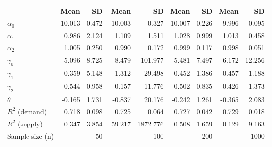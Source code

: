
\begin{tabular}[t]{lrrrrrrrr}
\toprule
  & Mean & SD & Mean  & SD  & Mean   & SD   & Mean    & SD   \\
\midrule
$\alpha_{0}$ & 10.013 & 0.472 & 10.003 & 0.327 & 10.007 & 0.226 & 9.996 & 0.095\\
$\alpha_{1}$ & 0.986 & 2.124 & 1.109 & 1.511 & 1.028 & 0.999 & 1.013 & 0.458\\
$\alpha_{2}$ & 1.005 & 0.250 & 0.990 & 0.172 & 0.999 & 0.117 & 0.998 & 0.051\\
$\gamma_{0}$ & 5.096 & 8.725 & 8.479 & 101.977 & 5.481 & 7.497 & 6.172 & 12.256\\
$\gamma_{1}$ & 0.359 & 5.148 & 1.312 & 29.498 & 0.452 & 1.386 & 0.457 & 1.188\\
$\gamma_{2}$ & 0.544 & 0.958 & 0.157 & 11.776 & 0.502 & 0.835 & 0.426 & 1.373\\
$\theta$ & -0.165 & 1.731 & -0.837 & 20.176 & -0.242 & 1.261 & -0.365 & 2.083\\
$R^{2}$ (demand) & 0.718 & 0.098 & 0.725 & 0.064 & 0.727 & 0.042 & 0.729 & 0.018\\
$R^{2}$ (supply) & 0.347 & 3.854 & -59.217 & 1872.776 & 0.508 & 1.659 & -0.129 & 9.163\\
Sample size (n) &  & 50 &  & 100 &  & 200 &  & 1000\\
\bottomrule
\end{tabular}
